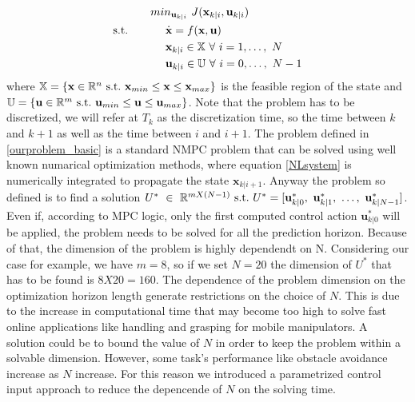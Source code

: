 \begin{equation} \label{ourproblem_basic}
\begin{split}
		& min_{\textbf{u}_{k|i}}\ J(\textbf{x}_{k|i},\textbf{u}_{k|i}) \\
		\textnormal{s.t.}\qquad
		&\ \ \ \ \dot{\textbf{x}}=f(\textbf{x},\textbf{u}) \\
		&\ \ \ \ \textbf{x}_{k|i} \in \mathbb{X}\ \forall\ i=1,\dots,\ N  \\
		&\ \ \ \ \textbf{u}_{k|i} \in \mathbb{U}\ \forall\ i=0,\dots,\ N-1 \\
	\end{split}	
\end{equation}
where $\mathbb{X} = \lbrace \textbf{x}\in \mathbb{R}^n\ \textnormal{s.t.}\ \textbf{x}_{min}\leq\textbf{x}\leq\textbf{x}_{max} \rbrace $ is the feasible region of the state and $\mathbb{U} = \lbrace \textbf{u}\in \mathbb{R}^m\ \textnormal{s.t.}\ \textbf{u}_{min}\leq\textbf{u}\leq\textbf{u}_{max} \rbrace $.
Note that the problem has to be discretized, we will refer at $T_k$ as the discretization time, so the time between $k$ and $k+1$ as well as the time between $i$ and $i+1$.
The problem defined in \ref{ourproblem_basic} is a standard NMPC problem that can be solved using well known numarical optimization methods, where equation \ref{NLsystem} is numerically integrated to propagate the state $\textbf{x}_{k|i+1}$. Anyway the problem so defined is to find a solution $U^*\ \in\ \mathbb{R}^{mX(N-1)}\ \textnormal{s.t.}\ U^* =[\textbf{u}^*_{k|0},\ \textbf{u}^*_{k|1},\ \dots,\ \textbf{u}^*_{k|N-1}]$. Even if, according to MPC logic, only the first computed control action $\textbf{u}^*_{k|0}$ will be applied, the problem needs to be solved for all the prediction horizon. Because of that, the dimension of the problem is highly dependendt on N. Considering our case for example, we have $m=8$, so if we set $N=20$ the dimension of $U^*$ that has to be found is $8X20=160$. The dependence of the problem dimension on the optimization horizon length generate restrictions on the choice of $N$. This is due to the increase in computational time that may become too high to solve fast online applications like handling and grasping for mobile manipulators. A solution could be to bound the value of $N$ in order to keep the problem within a solvable dimension. However, some task's performance like obstacle avoidance increase as $N$ increase. For this reason we introduced a parametrized control input approach to reduce the depencende of $N$ on the solving time.

